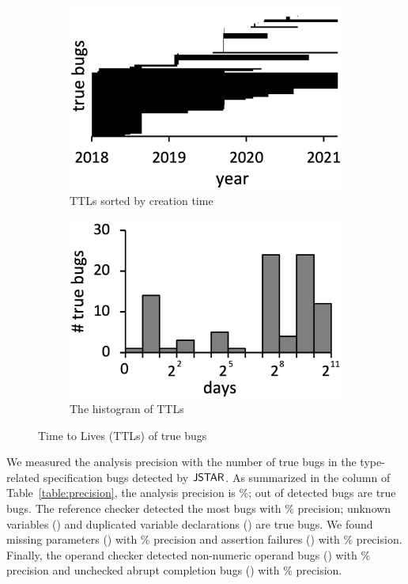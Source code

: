 \begin{figure}
  \centering
  \begin{subfigure}[b]{0.24\textwidth}
    \includegraphics[width=\textwidth]{img/ttl-chro}
    \caption{TTLs sorted by creation time}
  \end{subfigure}
  \begin{subfigure}[b]{0.24\textwidth}
    \includegraphics[width=\textwidth]{img/ttl-count}
    \caption{The histogram of TTLs}
  \end{subfigure}
  \caption{Time to Lives (TTLs) of true bugs}
  \vspace*{-1.5em}
  \label{fig:ttl}
\end{figure}

We measured the analysis precision with the number of true bugs in
the type-related specification bugs detected by $\tool$.
As summarized in the  column of Table~\ref{table:precision}, the analysis precision
is \%;  out of  detected bugs are true bugs.
The reference checker detected the most bugs with \% precision;
 unknown variables () and
 duplicated variable declarations () are true bugs.
We found  missing parameters () with \% precision and
 assertion failures () with \% precision.
Finally, the operand checker detected
 non-numeric operand bugs () with \% precision and
 unchecked abrupt completion bugs () with \% precision.

